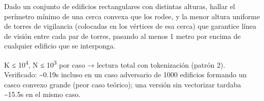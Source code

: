 
Dado un conjunto de edificios rectangulares con distintas alturas, hallar el perímetro mínimo de una cerca convexa que los rodee, y la menor altura uniforme de torres de vigilancia (colocadas en los vértices de esa cerca) que garantice línea de visión entre cada par de torres, pasando al menos 1 metro por encima de cualquier edificio que se interponga.

 K ≤ 10\textsuperscript{4}, N ≤ 10\textsuperscript{3} por caso → lectura total con tokenización (patrón 2). Verificado: \textasciitilde{}0.19s incluso en un caso adversario de 1000 edificios formando un casco convexo grande (peor caso teórico); una versión sin vectorizar tardaba \textasciitilde{}15.5s en el mismo caso.


